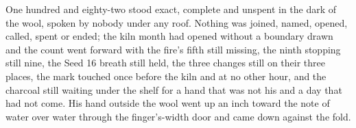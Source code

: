 One hundred and eighty-two stood exact, complete and unspent in the dark of the wool, spoken by nobody under any roof. Nothing was joined, named, opened, called, spent or ended; the kiln month had opened without a boundary drawn and the count went forward with the fire's fifth still missing, the ninth stopping still nine, the Seed 16 breath still held, the three changes still on their three places, the mark touched once before the kiln and at no other hour, and the charcoal still waiting under the shelf for a hand that was not his and a day that had not come. His hand outside the wool went up an inch toward the note of water over water through the finger's-width door and came down against the fold.
